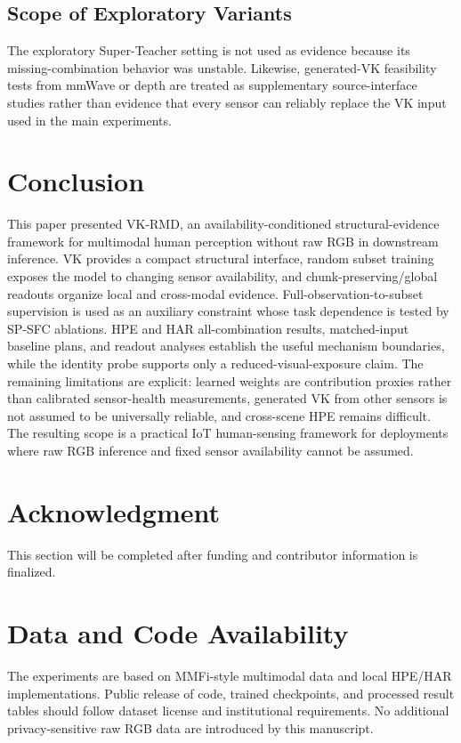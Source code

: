 ﻿\documentclass[journal]{IEEEtran}
\newcommand{\method}{VK-RMD}
\begin{document}
\subsection{Scope of Exploratory Variants}
The exploratory Super-Teacher setting is not used as evidence because its missing-combination behavior was unstable. Likewise, generated-VK feasibility tests from mmWave or depth are treated as supplementary source-interface studies rather than evidence that every sensor can reliably replace the VK input used in the main experiments.

\section{Conclusion}
This paper presented \method, an availability-conditioned structural-evidence framework for multimodal human perception without raw RGB in downstream inference. VK provides a compact structural interface, random subset training exposes the model to changing sensor availability, and chunk-preserving/global readouts organize local and cross-modal evidence. Full-observation-to-subset supervision is used as an auxiliary constraint whose task dependence is tested by SP-SFC ablations. HPE and HAR all-combination results, matched-input baseline plans, and readout analyses establish the useful mechanism boundaries, while the identity probe supports only a reduced-visual-exposure claim. The remaining limitations are explicit: learned weights are contribution proxies rather than calibrated sensor-health measurements, generated VK from other sensors is not assumed to be universally reliable, and cross-scene HPE remains difficult. The resulting scope is a practical IoT human-sensing framework for deployments where raw RGB inference and fixed sensor availability cannot be assumed.

\section*{Acknowledgment}
This section will be completed after funding and contributor information is finalized.

\section*{Data and Code Availability}
The experiments are based on MMFi-style multimodal data and local HPE/HAR implementations. Public release of code, trained checkpoints, and processed result tables should follow dataset license and institutional requirements. No additional privacy-sensitive raw RGB data are introduced by this manuscript.
\end{document}
